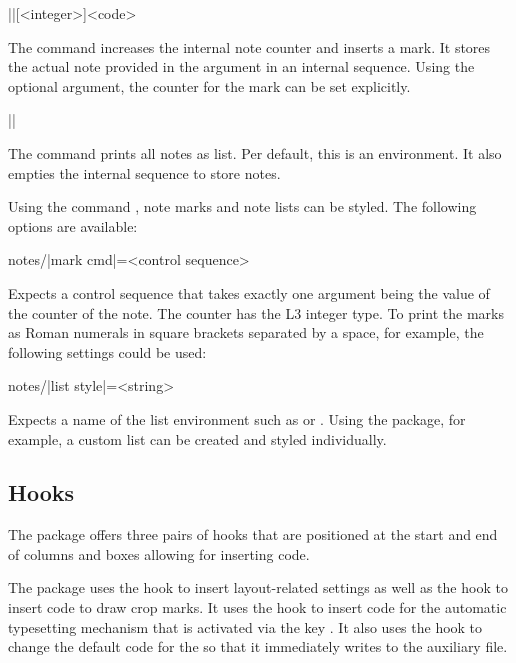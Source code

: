 \documentclass[a4paper]{article}
\begin{document}
\begin{macrodef}
|\leporellonote|[<integer>]{<code>}
\end{macrodef}
The command \macro{\leporellonote} increases the internal note counter and inserts a mark. It stores the actual note provided in the argument in an internal sequence. Using the optional argument, the counter for the mark can be set explicitly.

\begin{macrodef}
|\leporelloprintnotes|
\end{macrodef}
The command \macro{\leporelloprintnotes} prints all notes as list. Per default, this is an  environment. It also empties the internal sequence to store notes.

Using the command \macro{\leporelloset}, note marks and note lists can be styled. The following options are available:

\begin{macrodef}
notes/|mark cmd|={<control sequence>}
\end{macrodef}
Expects a control sequence that takes exactly one argument being the value of the counter of the note. The counter has the L3 integer type. To print the marks as Roman numerals in square brackets separated by a space, for example, the following settings could be used:

\begin{codeexample}
\end{codeexample}

\begin{macrodef}
notes/|list style|={<string>}
\end{macrodef}
Expects a name of the list environment such as  or . Using the  package, for example, a custom list can be created and styled individually.

\subsection{Hooks}

The package offers three pairs of hooks that are positioned at the start and end of columns and boxes allowing for inserting code.

The package uses the hook  to insert layout-related settings as well as the hook  to insert code to draw crop marks. It uses the hook \newline {} to insert code for the automatic typesetting mechanism that is activated via the key . It also uses the hook  to change the default code for the \macro{\label} so that it immediately writes to the auxiliary file.
\end{document}
